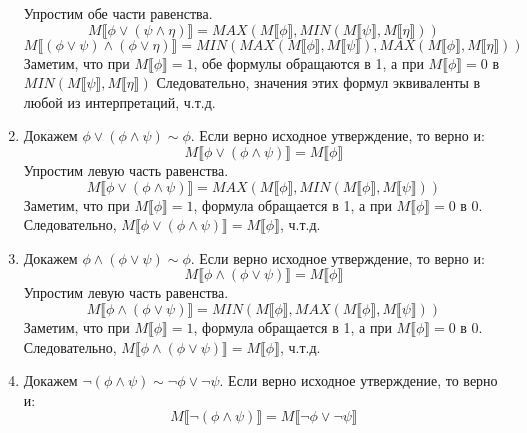 \documentclass{article}
\begin{document}
\begin{enumerate}
        Упростим обе части равенства.
        \[
            M \llbracket \phi \lor (\psi \land \eta) \rrbracket 
            = MAX(M \llbracket \phi \rrbracket, MIN(M \llbracket \psi \rrbracket, M \llbracket \eta \rrbracket))
        \]
        \[
            M \llbracket (\phi \lor \psi) \land (\phi \lor \eta) \rrbracket
            = MIN(MAX(M \llbracket \phi \rrbracket, M \llbracket \psi \rrbracket), MAX(M \llbracket \phi \rrbracket, M \llbracket \eta \rrbracket))
        \]
        Заметим, что при \(M \llbracket \phi \rrbracket = 1\), обе формулы обращаются в 1, 
        а при \(M \llbracket \phi \rrbracket = 0\) в \(MIN(M \llbracket \psi \rrbracket, M \llbracket \eta \rrbracket)\)
        Следовательно, значения этих формул эквиваленты в любой из интерпретаций, ч.т.д.
    \item
        Докажем \(\phi \lor (\phi \land \psi) \sim \phi\).
        Если верно исходное утверждение, то верно и:
        \[M \llbracket \phi \lor (\phi \land \psi) \rrbracket = M \llbracket \phi \rrbracket\]
        Упростим левую часть равенства.
        \[
            M \llbracket \phi \lor (\phi \land \psi) \rrbracket 
            = MAX(M \llbracket \phi \rrbracket, MIN(M \llbracket \phi \rrbracket, M \llbracket \psi \rrbracket))
        \]
        Заметим, что при \(M \llbracket \phi \rrbracket = 1\), формула обращается в 1, 
        а при \(M \llbracket \phi \rrbracket = 0\) в 0.
        Следовательно, 
        \(M \llbracket \phi \lor (\phi \land \psi) \rrbracket 
        = M \llbracket \phi \rrbracket\), ч.т.д.
    \item
        Докажем \(\phi \land (\phi \lor \psi) \sim \phi\).
        Если верно исходное утверждение, то верно и:
        \[M \llbracket \phi \land (\phi \lor \psi) \rrbracket = M \llbracket \phi \rrbracket\]
        Упростим левую часть равенства.
        \[
            M \llbracket \phi \land (\phi \lor \psi) \rrbracket 
            = MIN(M \llbracket \phi \rrbracket, MAX(M \llbracket \phi \rrbracket, M \llbracket \psi \rrbracket))
        \]
        Заметим, что при \(M \llbracket \phi \rrbracket = 1\), формула обращается в 1, 
        а при \(M \llbracket \phi \rrbracket = 0\) в 0.
        Следовательно, 
        \(M \llbracket \phi \land (\phi \lor \psi) \rrbracket 
        = M \llbracket \phi \rrbracket\), ч.т.д.
    \item
        Докажем \(\neg (\phi \land \psi) \sim \neg \phi \lor \neg \psi\).
        Если верно исходное утверждение, то верно и:
        \[M \llbracket \neg (\phi \land \psi) \rrbracket 
        = M \llbracket \neg \phi \lor \neg \psi \rrbracket\]

\end{enumerate}
\end{document}
